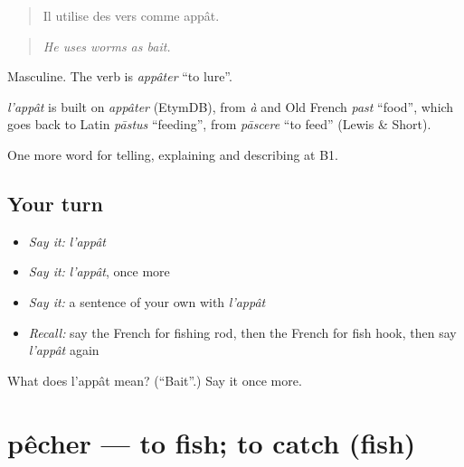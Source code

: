\begin{quote}
Il utilise des vers comme appât.
\end{quote}

\begin{quote}
\emph{He uses worms as bait.}
\end{quote}

Masculine. The verb is \emph{appâter} \textquotedblleft{}to lure\textquotedblright{}.

\begin{cousinweb}
\emph{l'appât} is built on \emph{appâter} (EtymDB), from \emph{à} and Old French \emph{past} \textquotedblleft{}food\textquotedblright{}, which goes back to Latin \emph{pāstus} \textquotedblleft{}feeding\textquotedblright{}, from \emph{pāscere} \textquotedblleft{}to feed\textquotedblright{} (Lewis \& Short).
\end{cousinweb}

\begin{grammarlens}[title={What you've built}]
One more word for telling, explaining and describing at B1.
\end{grammarlens}

\subsection*{Your turn}
\begin{itemize}
\raggedright
  \item \emph{Say it:} \emph{l'appât}
  \item \emph{Say it:} \emph{l'appât}, once more
  \item \emph{Say it:} a sentence of your own with \emph{l'appât}
  \item \emph{Recall:} say the French for fishing rod, then the French for fish hook, then say \emph{l'appât} again
\end{itemize}

\begin{tcolorbox}[breakable,colback=teal!4,colframe=teal!35!black,title={Before you move on}]
What does l'appât mean? (\textquotedblleft{}Bait\textquotedblright{}.) Say it once more.
\end{tcolorbox}
\section[pêcher]{pêcher — to fish; to catch (fish)}

\label{lesson:FR-C497-pecher}



